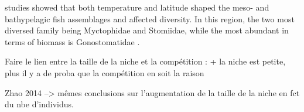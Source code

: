 
\citep{garcia2021} studies showed that both temperature and latitude shaped the meso- and bathypelagic fish assemblages and affected diversity. In this region, the two most diversed family being Myctophidae and Stomiidae, while the most abundant in terms of biomass is Gonostomatidae \citep{garcia2021}.

Faire le lien entre la taille de la niche et la compétition : + la niche est petite, plus il y a de proba que la compétition en soit la raison 

Zhao 2014 --> mêmes conclusions sur l'augmentation de la taille de la niche en fct du nbe d'individus.
